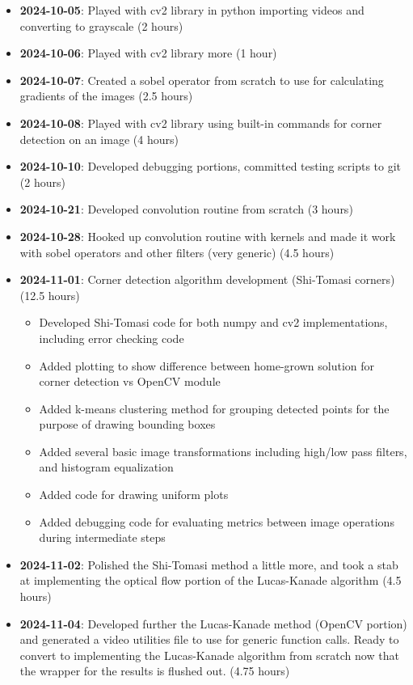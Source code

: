 \documentclass[11pt, conference, letterpaper]{IEEEtran}
\begin{document}
\begin{itemize}
    \item \textbf{2024-10-05}: Played with cv2 library in python importing videos and converting to grayscale (2 hours)
    \item \textbf{2024-10-06}: Played with cv2 library more (1 hour)
    \item \textbf{2024-10-07}: Created a sobel operator from scratch to use for calculating gradients of the images (2.5 hours)
    \item \textbf{2024-10-08}: Played with cv2 library using built-in commands for corner detection on an image (4 hours)
    \item \textbf{2024-10-10}: Developed debugging portions, committed testing scripts to git (2 hours)
    \item \textbf{2024-10-21}: Developed convolution routine from scratch (3 hours)
    \item \textbf{2024-10-28}: Hooked up convolution routine with kernels and made it work with sobel operators and other filters (very generic) (4.5 hours)
    \item \textbf{2024-11-01}: Corner detection algorithm development (Shi-Tomasi corners) (12.5 hours)
    \begin{itemize}
        \item Developed Shi-Tomasi code for both numpy and cv2 implementations, including error checking code
        \item Added plotting to show difference between home-grown solution for corner detection vs OpenCV module
        \item Added k-means clustering method for grouping detected points for the purpose of drawing bounding boxes
        \item Added several basic image transformations including high/low pass filters, and histogram equalization
        \item Added code for drawing uniform plots
        \item Added debugging code for evaluating metrics between image operations during intermediate steps
    \end{itemize}
    \item \textbf{2024-11-02}: Polished the Shi-Tomasi method a little more, and took a stab at implementing the optical flow portion of the Lucas-Kanade algorithm (4.5 hours)
    \item \textbf{2024-11-04}: Developed further the Lucas-Kanade method (OpenCV portion) and generated a video utilities file to use for generic function calls. Ready to convert to implementing the Lucas-Kanade algorithm from scratch now that the wrapper for the results is flushed out. (4.75 hours)

\end{itemize}
\end{document}
